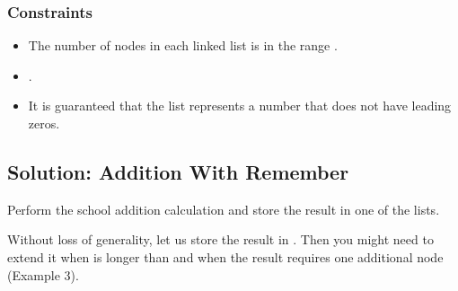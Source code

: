 \documentclass[letterpaper,12pt,english]{book}
\begin{document}
\subsubsection{Constraints}
\label{\detokenize{Linked_List/02_LL_2_add_two_numbers:constraints}}\begin{itemize}
\item {} 
\sphinxAtStartPar
The number of nodes in each linked list is in the range \sphinxcode{\sphinxupquote{{[}1, 100{]}}}.

\item {} 
\sphinxAtStartPar
{}.

\item {} 
\sphinxAtStartPar
It is guaranteed that the list represents a number that does not have leading zeros.

\end{itemize}


\subsection{Solution: Addition With Remember}
\label{\detokenize{Linked_List/02_LL_2_add_two_numbers:solution-addition-with-remember}}
\sphinxAtStartPar
Perform the school addition calculation and store the result in one of the lists.

\sphinxAtStartPar
Without loss of generality, let us store the result in . Then you might need to extend it when  is longer than  and when the result requires one additional node (Example 3).
\end{document}
